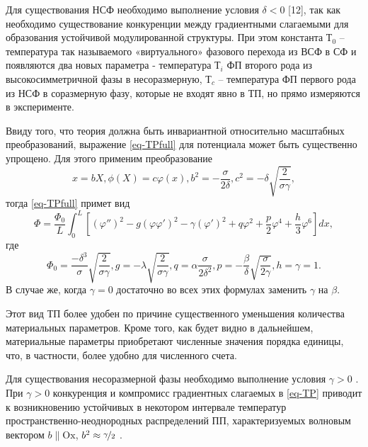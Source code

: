 Для существования НСФ необходимо выполнение условия $\delta < 0$ \cite{Ishibashi1978}[12], так как необходимо существование конкуренции между градиентными слагаемыми для образования устойчивой модулированной структуры.
При этом константа $Т_0$ -- температура так называемого «виртуального» фазового перехода из ВСФ в СФ и появляются два новых параметра - температура $Т_i$ ФП второго рода из высокосимметричной фазы в несоразмерную, $Т_c$ -- температура ФП первого рода из НСФ в соразмерную фазу, которые не входят явно в ТП, но прямо измеряются в эксперименте.

Ввиду того, что теория должна быть инвариантной относительно масштабных преобразований, выражение \ref{eq-TPfull} для потенциала может быть существенно упрощено.
Для этого применим преобразование
\begin{equation}
x = bX, \phi(X) = c\varphi(x), b^2 = -\frac{\sigma}{2\delta}, c^2 = -\delta\sqrt{\frac{2}{\sigma\gamma}},
\label{eq-subst}
\end{equation}
тогда \ref{eq-TPfull} примет вид
\begin{equation}
\Phi = \frac{\Phi_0}{L} \int_0^L \left[
            \left(\varphi''\right)^2 - g\left(\varphi\varphi'\right)^2 -
            \gamma\left(\varphi'\right)^2 +
            q\varphi^2 + \frac{p}{2}\varphi^4 + \frac{h}{3}\varphi^6
            \right] dx,
\label{eq-TP}
\end{equation}
где
\begin{equation}
\Phi_0 = \frac{-\delta^3}{\sigma}\sqrt{\frac{2}{\sigma\gamma}},
g = -\lambda\sqrt{\frac{2}{\sigma\gamma}},
q = \alpha\frac{\sigma}{2\delta^2},
p = -\frac{\beta}{\delta}\sqrt{\frac{\sigma}{2\gamma}},
h = \gamma = 1.
\label{eq-TPparts}
\end{equation}
В случае же, когда $\gamma=0$ достаточно во всех этих формулах заменить $\gamma$ на $\beta$.

Этот вид ТП более удобен по причине существенного уменьшения количества материальных параметров.
Кроме того, как будет видно в дальнейшем, материальные параметры приобретают численные значения порядка единицы, что, в частности, более удобно для численного счета.

Для существования несоразмерной фазы необходимо выполнение условия $\gamma>0$ \cite{Ishibashi1978}.
При $\gamma>0$ конкуренция и компромисс градиентных слагаемых в \ref{eq-TP} приводит к возникновению устойчивых в некотором интервале температур пространственно-неоднородных распределений ПП, характеризуемых волновым вектором $b \| \mathrm{Ox}$, $b^2 \approx \nicefrac{\gamma}{2}$ \cite{Ishibashi1978}.

